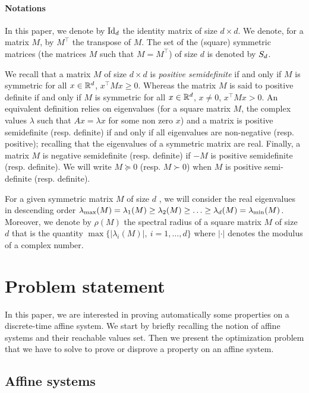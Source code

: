 \documentclass[10pt]{article}
\begin{document}
\paragraph{Notations}
In this paper, we denote by $\operatorname{Id}_d$ the identity matrix of size $d\times d$. We denote, for a matrix $M$, by $M^\intercal$ the transpose of $M$. The set of the (square) symmetric matrices  (the matrices $M$ such that $M=M^\intercal$) of size $d$ is denoted by $S_d$.  

We recall that a matrix $M$ of size $d\times d$ is {\it positive semidefinite} if and only if $M$ is symmetric for all $x\in\mathbb R^d$,
$x^\intercal M x\geq 0$. Whereas the matrix $M$ is said to positive definite if and only if $M$ is symmetric for all $x\in\mathbb R^d$, $x\neq 0$, 
$x^\intercal M x>0$. An equivalent definition relies on eigenvalues (for a square matrix $M$, the complex values $\lambda$ such that $Ax=\lambda x$ for some non zero $x$) and a matrix is positive semidefinite (resp. definite) if and only if all eigenvalues are non-negative (resp. positive); recalling that the eigenvalues of a symmetric matrix are real.
Finally, a matrix $M$ is negative semidefinite (resp. definite) if $-M$ is positive semidefinite (resp. definite).
We will write $M\succeq 0$ (resp. $M\succ 0$)  when $M$ is positive semi-definite (resp. definite).

For a given symmetric matrix $M$ of size $d$ , we will consider the real eigenvalues in descending order   $\lambda_{\operatorname{max}}(M)=\lambda_1(M)\geq \lambda_2(M)\geq \ldots\geq \lambda_d(M)=\lambda_{\operatorname{min}}(M)$. Moreover, we denote by $\rho(M)$ the spectral radius of a square matrix $M$ of size $d$ that is the quantity $\max\{|\lambda_i(M)|,\ i=1,\ldots,d\}$ where $|\cdot|$ denotes the modulus of a complex number.

\section{Problem statement}
\label{statement}
In this paper, we are interested in proving automatically some properties on a discrete-time affine system. We start by briefly recalling the notion of affine systems and their reachable values set. Then we present the optimization problem that we have to solve to prove or disprove a property on an affine system.

\subsection{Affine systems}
\end{document}
